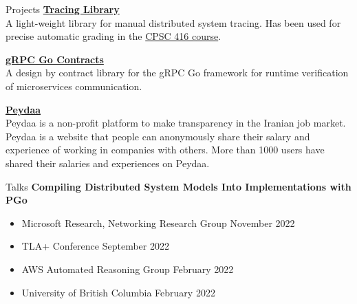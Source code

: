 \documentclass{resume} %
\begin{document}
\begin{rSection}{Projects}
	{\bf \href{https://github.com/DistributedClocks/tracing}{Tracing Library}}
	\\ A light-weight library for manual distributed system tracing. Has been used for precise 
  automatic grading in the
  \href{https://www.cs.ubc.ca/~bestchai/teaching/cs416_2020w2/index.html}{CPSC 416 course}.  

  {\bf \href{https://github.com/shayanh/grpc-go-contracts}{gRPC Go Contracts}}
  \\ A design by contract library for the gRPC Go framework for runtime
  verification of microservices communication.

	{\bf \href{https://peydaa.ir/}{Peydaa}}
	\\ Peydaa is a non-profit platform to make transparency in the Iranian job market. 
  Peydaa is a website that people can anonymously share their salary and experience of working 
  in companies with others. More than 1000 users have shared their salaries and 
  experiences on Peydaa.
\end{rSection}


\begin{rSection}{Talks}
  {\bf Compiling Distributed System Models Into Implementations with PGo}
	\vspace{-0.5em}
	\begin{itemize}[leftmargin=3mm]
		\setlength{\itemsep}{1pt}
		\setlength{\parskip}{0pt}
		\setlength{\parsep}{0pt}
		\renewcommand\labelitemi{$\cdot$}

		\item Microsoft Research, Networking Research Group \hfill November 2022
    \item TLA+ Conference \hfill September 2022
    \item AWS Automated Reasoning Group \hfill February 2022
    \item University of British Columbia \hfill February 2022
	\end{itemize}
\end{rSection}
\end{document}
